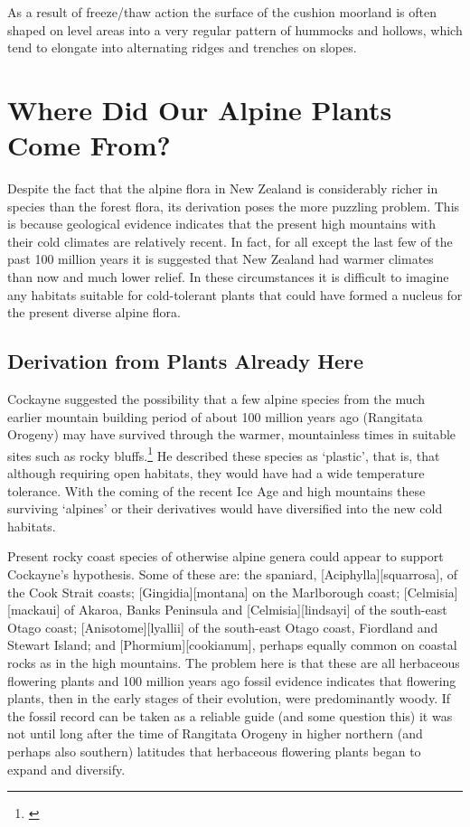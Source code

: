 As a result of freeze/thaw action the surface of the cushion moorland is often shaped on level areas into a very regular pattern of hummocks and hollows, which tend to elongate into alternating ridges and trenches on slopes.

\chapter{Where Did Our Alpine Plants Come From?}

Despite the fact that the alpine flora in New Zealand is considerably richer in species than the forest flora, its derivation poses the more puzzling problem.
This is because geological evidence indicates that the present high mountains with their cold climates are relatively recent.
In fact, for all except the last few of the past 100 million years it is suggested that New Zealand had warmer climates than now and much lower relief.
In these circumstances it is difficult to imagine any habitats suitable for cold-tolerant plants that could have formed a nucleus for the present diverse alpine flora.

\section{Derivation from Plants Already Here}

Cockayne suggested the possibility that a few alpine species from the much earlier mountain building period of about 100 million years ago (Rangitata Orogeny) may have survived through the warmer, mountainless times in suitable sites such as rocky bluffs.\footnote{\cite{cockayne1928vegetation}}
He described these species as `plastic', that is, that although requiring open habitats, they would have had a wide temperature tolerance.
With the coming of the recent Ice Age and high mountains these surviving `alpines' or their derivatives would have diversified into the new cold habitats.

Present rocky coast species of otherwise alpine genera could appear to support Cockayne's hypothesis.
Some of these are: the spaniard, [Aciphylla][squarrosa], of the Cook Strait coasts; [Gingidia][montana] on the Marlborough coast; [Celmisia][mackaui] of Akaroa, Banks Peninsula and [Celmisia][lindsayi] of the south-east Otago coast; [Anisotome][lyallii] of the south-east Otago coast, Fiordland and Stewart Island; and [Phormium][cookianum], perhaps equally common on coastal rocks as in the high mountains.
The problem here is that these are all herbaceous flowering plants and 100 million years ago fossil evidence indicates that flowering plants, then in the early stages of their evolution, were predominantly woody.
If the fossil record can be taken as a reliable guide (and some question this) it was not until long after the time of Rangitata Orogeny in higher northern (and perhaps also southern) latitudes that herbaceous flowering plants began to expand and diversify.

